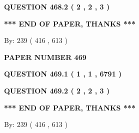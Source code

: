 \documentclass[12pt]{article}
\begin{document}
{\textbf{\Large{QUESTION
468.2 
 ( 2 , 2 , 3 )
}}}
  
  
   
   
 \vspace{0.2in}
 
   
   
   
   
\vspace{1.0in} 
{\textbf{\large{ *** END OF PAPER, THANKS *** }}} 
   
   
\hspace{1.0in} By: 
 239 ( 416 ,  613 )
   
   
   
   
\newpage 
\setcounter{page}{ 
   469001 } 
   
   
   
   
 {\textbf{ \Large{ PAPER NUMBER  469  }}}
   
   
\vspace{0.2in}
   
   
   
   
   
   
 \vspace{0.2in}
 
 
 
 
   
   
  
\vspace{0.2in}
  
{\textbf{\Large{QUESTION
469.1 
 ( 1 , 1 , 6791 )
}}}
  
  
  
\vspace{0.2in}
  
{\textbf{\Large{QUESTION
469.2 
 ( 2 , 2 , 3 )
}}}
  
  
   
   
 \vspace{0.2in}
 
   
   
   
   
\vspace{1.0in} 
{\textbf{\large{ *** END OF PAPER, THANKS *** }}} 
   
   
\hspace{1.0in} By: 
 239 ( 416 ,  613 )
   
   
   
   
\newpage 
\setcounter{page}{ 
   470001 } 
   
   
   
\end{document}
